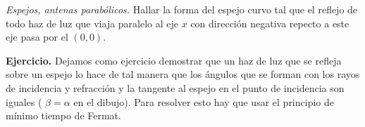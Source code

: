 \begin{ejemplo}
\textit{Espejos, antenas parabólicos.} Hallar la forma del espejo curvo tal que el reflejo de todo haz de luz que viaja paralelo al eje $x$ con dirección
negativa repecto a este eje pasa por el $(0,0)$.
\end{ejemplo}


\noindent\textbf{Ejercicio.} \actividad Dejamos como ejercicio demostrar que un haz de luz que se refleja sobre un espejo lo hace de tal manera que los ángulos que se forman con los rayos 
de incidencia y refracción y la tangente al espejo en el punto de incidencia son iguales ( $\beta=\alpha$ en el dibujo). Para resolver esto hay que usar el principio
de mínimo tiempo de Fermat.

